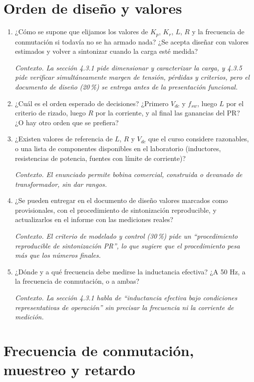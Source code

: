 \documentclass[11pt,a4paper]{article}
\newcommand{\ctx}[1]{\par\vspace{0.2em}\small\textit{Contexto. #1}\normalsize}
\begin{document}
\section{Orden de diseño y valores}

\begin{enumerate}[resume]
  \item ¿Cómo se supone que elijamos los valores de $K_p$, $K_r$, $L$, $R$ y la frecuencia de conmutación si todavía no se ha armado nada? ¿Se acepta diseñar con valores estimados y volver a sintonizar cuando la carga esté medida?
  \ctx{La sección 4.3.1 pide dimensionar y caracterizar la carga, y 4.3.5 pide verificar simultáneamente margen de tensión, pérdidas y criterios, pero el documento de diseño (20\,\%) se entrega antes de la presentación funcional.}

  \item ¿Cuál es el orden esperado de decisiones? ¿Primero $V_{dc}$ y $f_{sw}$, luego $L$ por el criterio de rizado, luego $R$ por la corriente, y al final las ganancias del PR? ¿O hay otro orden que se prefiera?

  \item ¿Existen valores de referencia de $L$, $R$ y $V_{dc}$ que el curso considere razonables, o una lista de componentes disponibles en el laboratorio (inductores, resistencias de potencia, fuentes con límite de corriente)?
  \ctx{El enunciado permite bobina comercial, construida o devanado de transformador, sin dar rangos.}

  \item ¿Se pueden entregar en el documento de diseño valores marcados como provisionales, con el procedimiento de sintonización reproducible, y actualizarlos en el informe con las mediciones reales?
  \ctx{El criterio de modelado y control (30\,\%) pide un ``procedimiento reproducible de sintonización PR'', lo que sugiere que el procedimiento pesa más que los números finales.}

  \item ¿Dónde y a qué frecuencia debe medirse la inductancia efectiva? ¿A 50 Hz, a la frecuencia de conmutación, o a ambas?
  \ctx{La sección 4.3.1 habla de ``inductancia efectiva bajo condiciones representativas de operación'' sin precisar la frecuencia ni la corriente de medición.}
\end{enumerate}

\section{Frecuencia de conmutación, muestreo y retardo}
\end{document}
